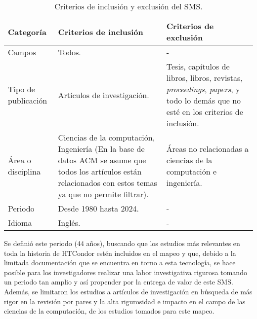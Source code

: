 \begin{table*}[htbp]
	
	\centering
	\renewcommand{\arraystretch}{1.7}  %
	\setlength{\tabcolsep}{3pt}      %
	\vspace{10pt}                     %
	\begin{tabularx}{\textwidth}{|>{\arraybackslash}m{2.3cm}|>{\arraybackslash}X|>{\arraybackslash}X|}
		\hline	
		\textbf{Categoría} & \textbf{Criterios de inclusión} & \textbf{Criterios de exclusión} \\
		\hline
		Campos &  Todos. & - \\
		\hline
		Tipo de publicación & Artículos de investigación. & Tesis, capítulos de libros, libros, revistas, \textit{proceedings}, \textit{papers}, y todo lo demás que no esté en los criterios de inclusión. \\
		\hline
		Área o disciplina & Ciencias de la computación, Ingeniería (En la base de datos ACM se asume que todos los artículos están relacionados con estos temas ya que no permite filtrar). & Áreas no relacionadas a ciencias de la computación e ingeniería. \\
		\hline
		Periodo & Desde 1980 hasta 2024. & - \\
		\hline
		Idioma & Inglés. & - \\
		\hline
	\end{tabularx}
	\vspace{6pt}  %
	\caption{Criterios de inclusión y exclusión del SMS.}
	\label{table:Criteria}
	
\end{table*}

Se definió este periodo (44 años), buscando que los estudios más relevantes en toda la historia de HTCondor estén incluidos en el mapeo y que, debido a la limitada documentación que se encuentra en torno a esta tecnología, se hace posible para los investigadores realizar una labor investigativa rigurosa tomando un periodo tan amplio y así propender por la entrega de valor de este SMS. Además, se limitaron los estudios a artículos de investigación en búsqueda de más rigor en la revisión por pares y la alta rigurosidad e impacto en el campo de las ciencias de la computación, de los estudios tomados para este mapeo.

